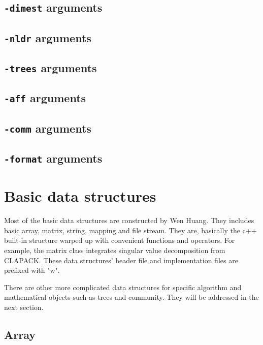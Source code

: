 \documentclass[11pt,a4paper]{article}
\theoremstyle{definition}
\theoremstyle{definition}
\numberwithin{equation}{section}
\begin{document}
	\subsection{\texttt{-dimest} arguments}
	
	\subsection{\texttt{-nldr} arguments}
	
	\subsection{\texttt{-trees} arguments}
	
	\subsection{\texttt{-aff} arguments}
	
	\subsection{\texttt{-comm} arguments}
	
	\subsection{\texttt{-format} arguments}
	
	
	
	\section{Basic data structures}
	
	Most of the basic data structures are constructed by Wen Huang. They includes basic array, matrix, string, mapping and file stream. They are, basically the c++ built-in structure warped up with convenient functions and operators. For example, the matrix class integrates singular value decomposition from CLAPACK. These data structures' header file and implementation files are prefixed with "w".
	
	There are other more complicated data structures for specific algorithm and mathematical objects such as trees and community. They will be addressed in the next section. 
	
	\subsection{Array}
	
\end{document}
